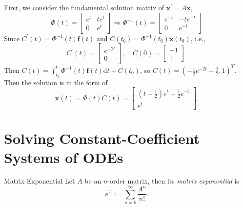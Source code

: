 \begin{solution}
  First, we consider the fundamental solution matrix of $\mathbf{x}^{\prime} = A\mathbf{x}$,
  \begin{equation}
    \Phi(t) =
    \begin{bmatrix}
      e^t & te^t\\
      0 & e^t
    \end{bmatrix} \Rightarrow
    \Phi^{-1}(t) =
    \begin{bmatrix}
      e^{-t} & -te^{-t}\\
      0 & e^{-t}
    \end{bmatrix}
  \end{equation}
  Since $C^{\prime}(t) = \Phi^{-1}(t)\mathbf{f}(t)$ and $C(t_0) = \Phi^{-1}(t_0)\mathbf{x}(t_0)$, i.e.,
  \begin{equation}
    C^{\prime}(t) =
    \begin{bmatrix}
      e^{-2t}\\
      0
    \end{bmatrix}, \quad
    C(0) =
    \begin{bmatrix}
      -1\\
      1
    \end{bmatrix}.
  \end{equation}
  Then $C(t) = \int_{t_0}^t \Phi^{-1}(t)\mathbf{f}(t) \mathrm{d} t + C(t_0)$,
  so $C(t) = (-\frac{1}{2}e^{-2t} - \frac{1}{2}, 1)^T$.
  Then the solution is in the form of
  \begin{equation}
    \mathbf{x}(t) = \Phi(t)C(t) = 
    \begin{bmatrix}
      (t-\frac{1}{2})e^t - \frac{1}{2}e^{-t}\\
      e^t
    \end{bmatrix}.
  \end{equation}
\end{solution}

\section{Solving Constant-Coefficient Systems of ODEs}

\begin{definition}{Matrix Exponential}{}
  Let $A$ be an $n$-order matrix, then its \emph{matrix exponential} is
  \begin{equation}
    e^A := \sum\limits_{n = 0}^{\infty} \frac{A^n}{n!}.
  \end{equation}
\end{definition}

